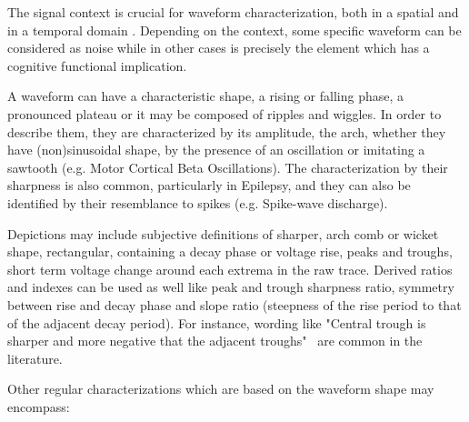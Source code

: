 \documentclass[brainsci,article,submit,moreauthors,pdftex,10pt,a4paper]{mdpi}
\begin{document}
The signal context is crucial for waveform characterization, both in a spatial and in a temporal domain \citep{Jansen1991}.  Depending on the context, some specific waveform can be considered as noise while in other cases is precisely the element which has a cognitive functional implication.



%

A waveform can have a characteristic shape, a rising or falling phase, a pronounced plateau or it may be composed of ripples and wiggles. In order to describe them, they are characterized by its amplitude, the arch, whether they have (non)sinusoidal shape, by the presence of an oscillation or imitating a sawtooth (e.g. Motor Cortical Beta Oscillations).  The characterization by their sharpness is also common, particularly in Epilepsy, and they can also be identified by their resemblance to spikes (e.g. Spike-wave discharge).

Depictions may include subjective definitions of sharper, arch comb or wicket shape, rectangular, containing a decay phase or voltage rise, peaks and troughs, short term voltage change around each extrema in the raw trace.  Derived ratios and indexes can be used as well like peak and trough sharpness ratio, symmetry between rise and decay phase and slope ratio (steepness of the rise period to that of the adjacent decay period).  For instance,  wording like "Central trough is sharper and more negative that the adjacent troughs"~\citep{Cole2017} are common in the literature.

Other regular characterizations which are based on the waveform shape may encompass:
\end{document}
